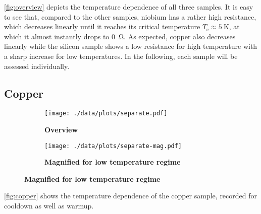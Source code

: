\autoref{fig:overview} depicts the temperature dependence of all three samples.
It is easy to see that, compared to the other samples, niobium has a rather high resistance, which decreases linearly until it reaches its critical temperature $T_\text{c}\approx\SI{5}{\kelvin}$, at which it almost instantly drops to \SI{0}{\ohm}.
As expected, copper also decreases linearly while the silicon sample shows a low resistance for high temperature with a sharp increase for low temperatures.
In the following, each sample will be assessed individually.

\subsection{Copper}
\begin{figure}
\begin{adjustwidth}{-1cm}{-1cm}
	\centering
	\begin{subfigure}{.55\textwidth}
		\centering
		\texttt{[image: ./data/plots/separate.pdf]}
		\caption{\textbf{Overview}}
	\end{subfigure}
	\hfill
	\begin{subfigure}{.55\textwidth}
		\centering
		\texttt{[image: ./data/plots/separate-mag.pdf]}
		\caption{\textbf{Magnified for low temperature regime}}
	\end{subfigure}
	\label{fig:copper}
\end{adjustwidth}
\end{figure}

\autoref{fig:copper} shows the temperature dependence of the copper sample, recorded for cooldown as well as warmup.

